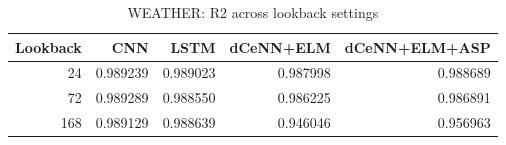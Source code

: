 \begin{table}
\caption{WEATHER: R2 across lookback settings}
\begin{tabular}{rrrrr}
\toprule
Lookback & CNN & LSTM & dCeNN+ELM & dCeNN+ELM+ASP \\
\midrule
24 & 0.989239 & 0.989023 & 0.987998 & 0.988689 \\
72 & 0.989289 & 0.988550 & 0.986225 & 0.986891 \\
168 & 0.989129 & 0.988639 & 0.946046 & 0.956963 \\
\bottomrule
\end{tabular}
\end{table}

